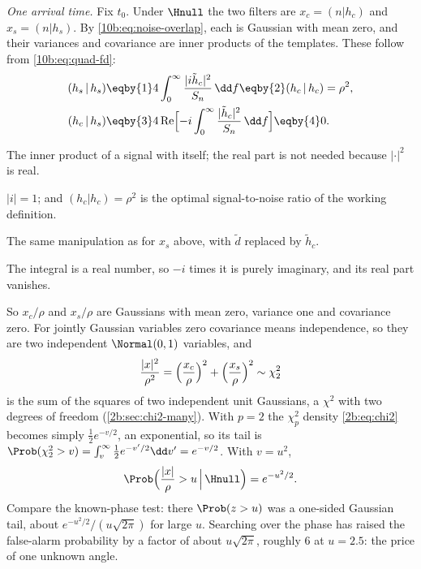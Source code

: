 \emph{One arrival time.} Fix $t_0$. Under $\Hnull$ the two filters are $x_c=(n|h_c)$ and $x_s=(n|h_s)$. By
\eqref{10b:eq:noise-overlap}, each is Gaussian with mean zero, and their variances and covariance are inner products of
the templates. These follow from \eqref{10b:eq:quad-fd}:
\begin{align}
  (h_s\,|\,h_s)&\eqby{1}4\int_0^\infty\frac{|i\tilde h_c|^2}{S_n}\,\dd f\eqby{2}(h_c\,|\,h_c)=\rho^2,\nonumber\\
  (h_c\,|\,h_s)&\eqby{3}4\,\mathrm{Re}\Bigl[-i\int_0^\infty\frac{|\tilde h_c|^2}{S_n}\,\dd f\Bigr]\eqby{4}0 .
\end{align}
\begin{explain}
  \item The inner product of a signal with itself; the real part is not needed because $|\cdot|^2$ is real.
  \item $|i|=1$; and $(h_c|h_c)=\rho^2$ is the optimal signal-to-noise ratio of the working definition.
  \item The same manipulation as for $x_s$ above, with $\tilde d$ replaced by $\tilde h_c$.
  \item The integral is a real number, so $-i$ times it is purely imaginary, and its real part vanishes.
\end{explain}
So $x_c/\rho$ and $x_s/\rho$ are Gaussians with mean zero, variance one and covariance zero. For jointly Gaussian
variables zero covariance means independence, so they are two independent $\Normal(0,1)$ variables, and
\begin{equation}
  \frac{|x|^2}{\rho^2}=\Bigl(\frac{x_c}{\rho}\Bigr)^2+\Bigl(\frac{x_s}{\rho}\Bigr)^2\sim\chi^2_2
\end{equation}
is the sum of the squares of two independent unit Gaussians, a $\chi^2$ with two degrees of freedom
(\cref{2b:sec:chi2-many}). With $p=2$ the $\chi^2_p$ density \eqref{2b:eq:chi2} becomes simply $\tfrac12e^{-v/2}$, an
exponential, so its tail is $\Prob(\chi^2_2>v)=\int_v^\infty\tfrac12e^{-v'/2}\dd v'=e^{-v/2}$. With $v=u^2$,
\begin{equation}
  \Prob\Bigl(\frac{|x|}{\rho}>u\,\Big|\,\Hnull\Bigr)=e^{-u^2/2}.
  \label{10b:eq:rayleigh-tail}
\end{equation}
Compare the known-phase test: there $\Prob(z>u)$ was a one-sided Gaussian tail, about $e^{-u^2/2}/(u\sqrt{2\pi})$ for
large $u$. Searching over the phase has raised the false-alarm probability by a factor of about $u\sqrt{2\pi}$, roughly
$6$ at $u=2.5$: the price of one unknown angle.

